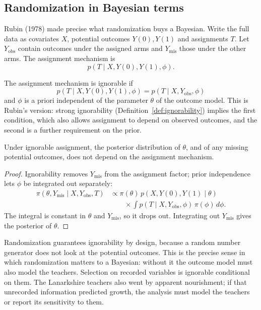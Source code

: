 \subsection{Randomization in Bayesian terms}

Rubin (1978) made precise what randomization buys a Bayesian. Write the full data as covariates $X$, potential outcomes $Y(0), Y(1)$ and assignments $T$. Let $Y_{\mathrm{obs}}$ contain outcomes under the assigned arms and $Y_{\mathrm{mis}}$ those under the other arms. The assignment mechanism is
\[
p(T \mid X, Y(0), Y(1), \phi).
\]

\begin{definition}
The assignment mechanism is ignorable if
\[
p(T \mid X, Y(0), Y(1), \phi) = p(T \mid X, Y_{\mathrm{obs}}, \phi)
\]
and $\phi$ is a priori independent of the parameter $\theta$ of the outcome model. This is Rubin's version: strong ignorability (Definition~\ref{def:ignorability}) implies the first condition, which also allows assignment to depend on observed outcomes, and the second is a further requirement on the prior.
\end{definition}

\begin{theorem}[Rubin]
Under ignorable assignment, the posterior distribution of $\theta$, and of any missing potential outcomes, does not depend on the assignment mechanism.
\end{theorem}

\begin{proof}
Ignorability removes $Y_{\mathrm{mis}}$ from the assignment factor; prior independence lets $\phi$ be integrated out separately:
\begin{align*}
\pi(\theta, Y_{\mathrm{mis}} \mid X, Y_{\mathrm{obs}}, T) &\propto \pi(\theta)\, p(X, Y(0), Y(1) \mid \theta) \\
&\qquad \times \int p(T \mid X, Y_{\mathrm{obs}}, \phi)\, \pi(\phi)\, d\phi.
\end{align*}
The integral is constant in $\theta$ and $Y_{\mathrm{mis}}$, so it drops out. Integrating out $Y_{\mathrm{mis}}$ gives the posterior of $\theta$.
\end{proof}

Randomization guarantees ignorability by design, because a random number generator does not look at the potential outcomes. This is the precise sense in which randomization matters to a Bayesian: without it the outcome model must also model the teachers. Selection on recorded variables is ignorable conditional on them. The Lanarkshire teachers also went by apparent nourishment; if that unrecorded information predicted growth, the analysis must model the teachers or report its sensitivity to them.

